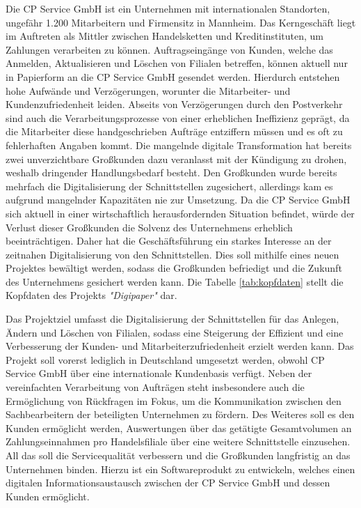 Die CP Service GmbH ist ein Unternehmen mit internationalen Standorten, ungefähr 1.200 Mitarbeitern und Firmensitz in Mannheim. Das Kerngeschäft liegt im Auftreten als Mittler zwischen Handelsketten und Kreditinstituten, um Zahlungen verarbeiten zu können. Auftragseingänge von Kunden, welche das Anmelden, Aktualisieren und Löschen von Filialen betreffen, können aktuell nur in Papierform an die CP Service GmbH gesendet werden. Hierdurch entstehen hohe Aufwände und Verzögerungen, worunter die Mitarbeiter- und Kundenzufriedenheit leiden. Abseits von Verzögerungen durch den Postverkehr sind auch die Verarbeitungsprozesse von einer erheblichen Ineffizienz geprägt, da die Mitarbeiter diese handgeschrieben Aufträge entziffern müssen und es oft zu fehlerhaften Angaben kommt. Die mangelnde digitale Transformation hat bereits zwei unverzichtbare Großkunden dazu veranlasst mit der Kündigung zu drohen, weshalb dringender Handlungsbedarf besteht. Den Großkunden wurde bereits mehrfach die Digitalisierung der Schnittstellen zugesichert, allerdings kam es aufgrund mangelnder Kapazitäten nie zur Umsetzung. Da die CP Service GmbH sich aktuell in einer wirtschaftlich herausfordernden Situation befindet, würde der Verlust dieser Großkunden die Solvenz des Unternehmens erheblich beeinträchtigen. Daher hat die Geschäftsführung ein starkes Interesse an der zeitnahen Digitalisierung von den Schnittstellen.
Dies soll mithilfe eines neuen Projektes bewältigt werden, sodass die Großkunden befriedigt und die Zukunft des Unternehmens gesichert werden kann. Die Tabelle \ref{tab:kopfdaten} stellt die Kopfdaten des Projekts \textit{"Digipaper"} dar. 
\vspace{10pt}

Das Projektziel umfasst die Digitalisierung der Schnittstellen für das Anlegen, Ändern und Löschen von Filialen, sodass eine Steigerung der Effizient und eine Verbesserung der Kunden- und Mitarbeiterzufriedenheit erzielt werden kann. Das Projekt soll vorerst lediglich in Deutschland umgesetzt werden, obwohl CP Service GmbH über eine internationale Kundenbasis verfügt. Neben der vereinfachten Verarbeitung von Aufträgen steht insbesondere auch die Ermöglichung von Rückfragen im Fokus, um die Kommunikation zwischen den Sachbearbeitern der beteiligten Unternehmen zu fördern. Des Weiteres soll es den Kunden ermöglicht werden, Auswertungen über das getätigte Gesamtvolumen an Zahlungseinnahmen pro Handelsfiliale über eine weitere Schnittstelle einzusehen. All das soll die Servicequalität verbessern und die Großkunden langfristig an das Unternehmen binden. Hierzu ist ein Softwareprodukt zu entwickeln, welches einen digitalen Informationsaustausch zwischen der CP Service GmbH und dessen Kunden ermöglicht. 


